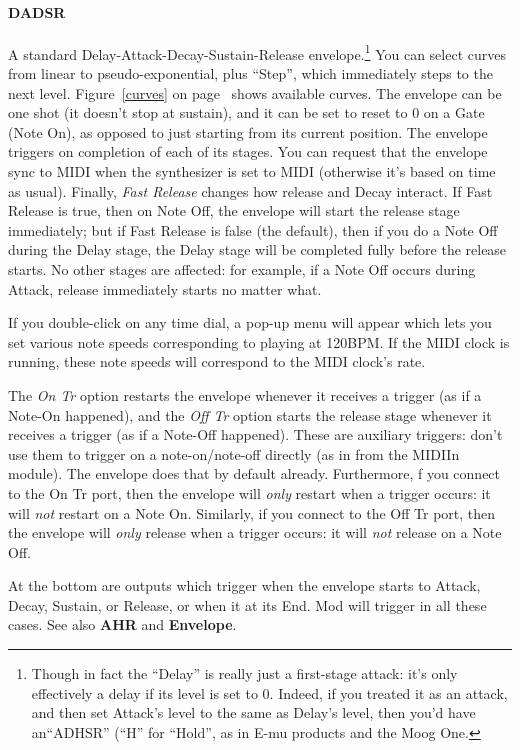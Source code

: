 \documentclass{article}
\begin{document}
\paragraph{DADSR}  A standard Delay-Attack-Decay-Sustain-Release envelope.\footnote{Though in fact the ``Delay'' is really just a first-stage attack: it's only effectively a delay if its level is set to 0.  Indeed, if you treated it as an attack, and then set Attack's level to the same as Delay's level, then you'd have an``ADHSR'' (``H'' for ``Hold'', as in E-mu products and the Moog One.} You can select curves from linear to pseudo-exponential, plus ``Step'', which immediately steps to the next level.  Figure~\ref{curves} on page~\pageref{curves} shows available curves.  The envelope can be one shot (it doesn't stop at sustain), and it can be set to reset to 0 on a Gate (Note On), as opposed to just starting from its current position.  The envelope triggers on completion of each of its stages.  You can request that the envelope sync to MIDI when the synthesizer is set to MIDI (otherwise it's based on time as usual).  Finally, {\it Fast Release} changes how release and Decay interact.  If Fast Release is true, then on Note Off, the envelope will start the release stage immediately; but if Fast Release is false (the default), then if you do a Note Off during the Delay stage, the Delay stage will be completed fully before the release starts.  No other stages are affected: for example, if a Note Off occurs during Attack, release immediately starts no matter what.

If you double-click on any time dial, a pop-up menu will appear which lets you set various note speeds corresponding to playing at 120BPM.  If the MIDI clock is running, these note speeds will correspond to the MIDI clock's rate.

The {\it On Tr} option restarts the envelope whenever it receives a trigger (as if a Note-On happened), and the {\it Off Tr} option starts the release stage whenever it receives a trigger (as if a Note-Off happened).  These are auxiliary triggers: don't use them to trigger on a note-on/note-off directly (as in from the MIDIIn module).  The envelope does that by default already.  Furthermore, f you connect to the On Tr port, then the envelope will {\it only} restart when a trigger occurs: it will {\it not} restart on a Note On.  Similarly, if you connect to the Off Tr port, then the envelope will {\it only} release when a trigger occurs: it will {\it not} release on a Note Off.  
 
At the bottom are outputs which trigger when the envelope starts to Attack, Decay, Sustain, or Release, or when it at its End.  Mod will trigger in all these cases.  See also {\bf AHR} and {\bf Envelope}.
\end{document}
